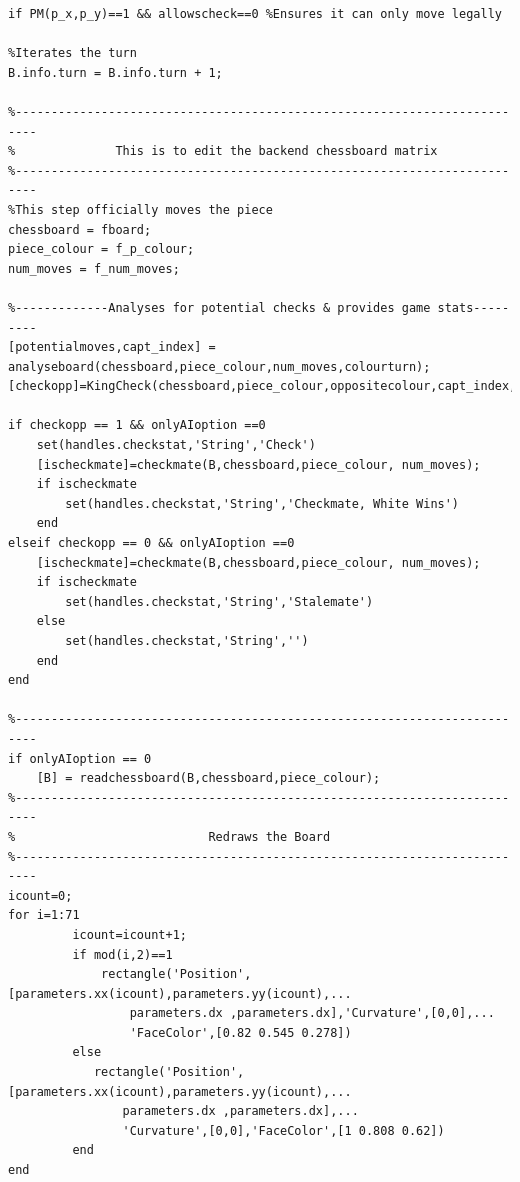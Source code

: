 \documentclass[11pt,a4paper]{article}
\begin{document}
\begin{lstlisting}
if PM(p_x,p_y)==1 && allowscheck==0 %Ensures it can only move legally
    
%Iterates the turn
B.info.turn = B.info.turn + 1;

%-------------------------------------------------------------------------
%              This is to edit the backend chessboard matrix
%-------------------------------------------------------------------------
%This step officially moves the piece
chessboard = fboard;
piece_colour = f_p_colour; 
num_moves = f_num_moves;

%-------------Analyses for potential checks & provides game stats---------
[potentialmoves,capt_index] = analyseboard(chessboard,piece_colour,num_moves,colourturn);
[checkopp]=KingCheck(chessboard,piece_colour,oppositecolour,capt_index,potentialmoves);

if checkopp == 1 && onlyAIoption ==0
    set(handles.checkstat,'String','Check')
    [ischeckmate]=checkmate(B,chessboard,piece_colour, num_moves);
    if ischeckmate
        set(handles.checkstat,'String','Checkmate, White Wins')
    end
elseif checkopp == 0 && onlyAIoption ==0
    [ischeckmate]=checkmate(B,chessboard,piece_colour, num_moves);
    if ischeckmate
        set(handles.checkstat,'String','Stalemate')
    else
        set(handles.checkstat,'String','')
    end
end

%-------------------------------------------------------------------------
if onlyAIoption == 0
    [B] = readchessboard(B,chessboard,piece_colour);
%-------------------------------------------------------------------------
%                           Redraws the Board
%-------------------------------------------------------------------------
icount=0;
for i=1:71
         icount=icount+1;
         if mod(i,2)==1
             rectangle('Position',[parameters.xx(icount),parameters.yy(icount),...
                 parameters.dx ,parameters.dx],'Curvature',[0,0],...
                 'FaceColor',[0.82 0.545 0.278])
         else
            rectangle('Position',[parameters.xx(icount),parameters.yy(icount),...
                parameters.dx ,parameters.dx],...
                'Curvature',[0,0],'FaceColor',[1 0.808 0.62])             
         end
end


\end{lstlisting}
\end{document}
